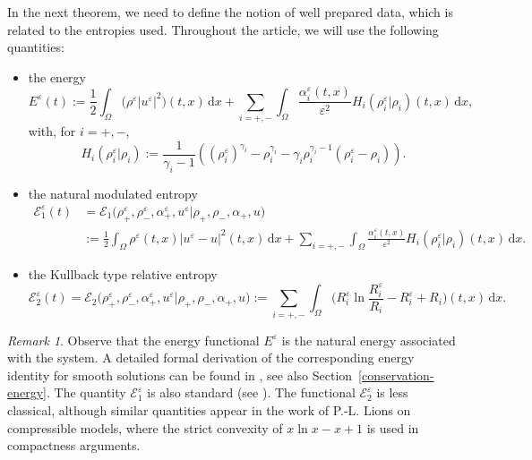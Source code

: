 \documentclass[11pt, twoside, a4paper]{article}
\theoremstyle{plain}
\theoremstyle{remark}
\newtheorem{remark}[theorem]{Remark}
\numberwithin{equation}{section}
\def\EE{{\mathcal E}}
\newcommand{\dd}{\,\mathrm{d}}
\renewcommand{\epsilon}{\varepsilon}
\newcommand{\eps}{\varepsilon}
\begin{document}
In the next theorem, we need to define the notion of well prepared data, which is related to the entropies used. Throughout the article, we will use the following quantities:
\begin{itemize}
 \item the energy
 \begin{equation}\label{def-Energy}
 E^\eps(t) := \frac{1}{2} \int_{\Omega} \Big(\rho^\varepsilon |u^\eps|^2\Big)(t,x) \dd x
 + \sum_{i=+,-} \int_{\Omega} \frac{\alpha_i^{\epsilon}(t,x)}{\epsilon^2} H_i(\rho_i^\eps | \rho_i)(t,x)\dd x ,
 \end{equation}
 with, for $i=+,-$,
\begin{equation}\label{H}
 H_i(\rho_i^\eps | \rho_i) := \frac{1}{\gamma_i-1} \left( (\rho_i^{\epsilon})^{\gamma_i} - \rho_i^{\gamma_i} - \gamma_i\rho_i^{\gamma_i-1}(\rho_i^{\epsilon}-\rho_i) \right).
\end{equation}
 \item the natural modulated entropy
 \begin{equation}\label{def-E1}
 \begin{aligned}
 \EE_1^\eps(t) &= \EE_1\Big(\rho^{\epsilon}_+,\rho^{\epsilon}_-,\alpha^{\epsilon}_+,u^{\epsilon}| \rho_+,\rho_-,\alpha_+,u\Big) \\
 &:=
 \frac{1}{2} \int_{\Omega} \rho^{\epsilon}(t,x) |u^{\epsilon} - u|^2(t,x)\dd x 
 + \sum_{i=+,-} \int_{\Omega} \frac{\alpha_i^{\epsilon}(t,x)}{\epsilon^2} H_i(\rho_i^\eps | \rho_i)(t,x)\dd x .
 \end{aligned}
 \end{equation}
 \item the Kullback type relative entropy
 \begin{equation}\label{def-E2}
 \EE_2^\eps(t) =\EE_2\Big(\rho^{\epsilon}_+,\rho^{\epsilon}_-,\alpha^{\epsilon}_+,u^{\epsilon}| \rho_+,\rho_-,\alpha_+,u\Big) :=\sum_{i=+,-} \int_\Omega \Big(R_{i}^\varepsilon \ln \frac{R_{i}^\varepsilon}{R_{i}} - R_i^\eps+R_i\Big)(t,x)\dd x .
 \end{equation}
 \end{itemize}
\begin{remark}
Observe that the energy functional $E^\eps$ is the natural energy associated with the system. A detailed formal derivation of the corresponding energy identity for smooth solutions can be found in \cite{lebot2025low}, see also Section~\ref{conservation-energy}. The quantity $\mathcal{E}_1^\eps$ is also standard (see \cite{lions1996mathematical}). The functional $\EE_2^\eps$ is less classical, although similar quantities appear in the work of P.-L. Lions on compressible models, where the strict convexity of $x\ln x - x + 1$ is used in compactness arguments.
\end{remark}
\end{document}

